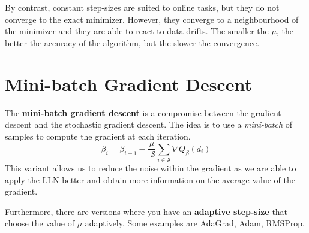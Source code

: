 By contrast, constant step-sizes are suited to online tasks, but they do not converge to the exact minimizer. However, they converge to a neighbourhood of the minimizer and they are able to react to data drifts. The smaller the $\mu$, the better the accuracy of the algorithm, but the slower the convergence.

\section{Mini-batch Gradient Descent}
The \textbf{mini-batch gradient descent} is a compromise between the gradient descent and the stochastic gradient descent. The idea is to use a \textit{mini-batch} of samples to compute the gradient at each iteration.
\[
    \beta_{i} = \beta_{i-1} - \frac{\mu}{|\mathcal S}\sum_{i\in \mathcal S} \nabla Q_\beta(d_i)
\]
This variant allows us to reduce the noise within the gradient as we are able to apply the LLN better and obtain more information on the average value of the gradient.

Furthermore, there are versions where you have an \textbf{adaptive step-size} that choose the value of $\mu$ adaptively. Some examples are AdaGrad, Adam, RMSProp.